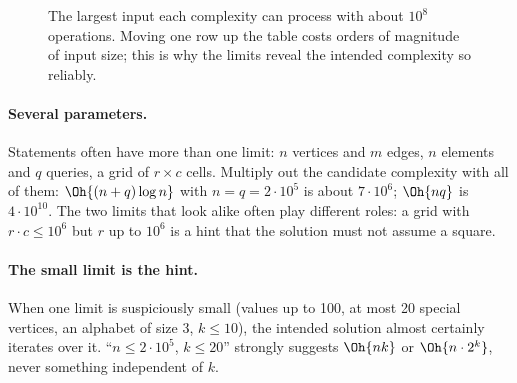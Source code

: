 \begin{figure}[htbp]
\centering
{}
\caption{The largest input each complexity can process with about $10^8$ operations. Moving one row up the table costs
orders of magnitude of input size; this is why the limits reveal the intended complexity so reliably.}
\label{fig:maxn}
\end{figure}

\paragraph{Several parameters.} Statements often have more than one limit: $n$ vertices and $m$ edges, $n$ elements and $q$
queries, a grid of $r \times c$ cells. Multiply out the candidate complexity with all of them: $\Oh{(n + q) \log n}$ with
$n = q = 2 \cdot 10^5$ is about $7 \cdot 10^6$; $\Oh{nq}$ is $4\cdot 10^{10}$. The two limits that look alike often play
different roles: a grid with $r \cdot c \le 10^6$ but $r$ up to $10^6$ is a hint that the solution must not assume a square.

\paragraph{The small limit is the hint.} When one limit is suspiciously small (values up to 100, at most 20 special
vertices, an alphabet of size 3, $k \le 10$), the intended solution almost certainly iterates over it. ``$n \le 2\cdot10^5$,
$k \le 20$'' strongly suggests $\Oh{nk}$ or $\Oh{n \cdot 2^k}$, never something independent of $k$.

